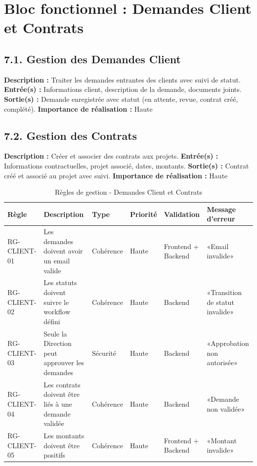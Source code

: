 \section{Bloc fonctionnel : Demandes Client et Contrats}

\subsection{7.1. Gestion des Demandes Client}
\textbf{Description :} Traiter les demandes entrantes des clients avec suivi de statut.
\textbf{Entrée(s) :} Informations client, description de la demande, documents joints.
\textbf{Sortie(s) :} Demande enregistrée avec statut (en attente, revue, contrat créé, complété).
\textbf{Importance de réalisation :} Haute

\subsection{7.2. Gestion des Contrats}
\textbf{Description :} Créer et associer des contrats aux projets.
\textbf{Entrée(s) :} Informations contractuelles, projet associé, dates, montants.
\textbf{Sortie(s) :} Contrat créé et associé au projet avec suivi.
\textbf{Importance de réalisation :} Haute

\begin{table}[H]
\centering
\footnotesize
\begin{tabular}{|p{1.5cm}|p{3.5cm}|p{1.5cm}|p{1.5cm}|p{2cm}|p{2.5cm}|}
\hline
\textbf{Règle} & \textbf{Description} & \textbf{Type} & \textbf{Priorité} & \textbf{Validation} & \textbf{Message d'erreur} \\
\hline
RG-CLIENT-01 & Les demandes doivent avoir un email valide & Cohérence & Haute & Frontend + Backend & «Email invalide» \\
\hline
RG-CLIENT-02 & Les statuts doivent suivre le workflow défini & Cohérence & Haute & Backend & «Transition de statut invalide» \\
\hline
RG-CLIENT-03 & Seule la Direction peut approuver les demandes & Sécurité & Haute & Backend & «Approbation non autorisée» \\
\hline
RG-CLIENT-04 & Les contrats doivent être liés à une demande validée & Cohérence & Haute & Backend & «Demande non validée» \\
\hline
RG-CLIENT-05 & Les montants doivent être positifs & Cohérence & Haute & Frontend + Backend & «Montant invalide» \\
\hline
\end{tabular}
\caption{Règles de gestion - Demandes Client et Contrats}
\label{tab:rg_client}
\end{table}

